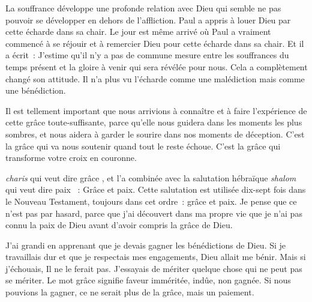 
La souffrance développe une profonde relation avec Dieu qui semble
 ne pas pouvoir se développer en dehors de l'affliction.
 Paul a appris à louer Dieu par cette écharde dans sa chair.
 Le jour est même arrivé où Paul a vraiment commencé à se réjouir
 et à remercier Dieu pour cette écharde dans sa chair.
 Et il a écrit~: 
 \og J'estime qu'il n'y a pas de commune mesure entre les souffrances
 du temps présent et la gloire à venir qui sera révélée pour nous. \fg{}
 Cela a complètement changé son attitude. Il n'a plus vu l'écharde
 comme une malédiction mais comme une bénédiction.

Il est tellement important que nous arrivions à connaître
 et à faire l'expérience de cette grâce toute-suffisante,
 parce qu'elle nous guidera dans les moments les plus sombres,
 et nous aidera à garder le sourire dans nos moments de déception.
 C'est la grâce qui va nous soutenir quand tout le reste échoue.
 C'est la grâce qui transforme votre croix en couronne.

\dvrule






 \emph{charis}
 qui veut dire \og grâce \fg{}, et l'a combinée avec la salutation
 hébraïque \emph{shalom} qui veut dire \og paix \fg{}~: 
 \og Grâce et paix. \fg{}
 Cette salutation est utilisée dix-sept fois dans le Nouveau Testament,
 toujours dans cet ordre~:  \og grâce et paix. \fg{}
 Je pense que ce n'est pas par hasard, parce que j'ai découvert
 dans ma propre vie que je n'ai pas connu la paix de Dieu
 avant d'avoir compris la grâce de Dieu.

J'ai grandi en apprenant que je devais gagner les bénédictions de Dieu.
 Si je travaillais dur et que je respectais mes engagements,
 Dieu allait me bénir. Mais si j'échouais, Il ne le ferait pas.
 J'essayais de mériter quelque chose qui ne peut pas se mériter.
 Le mot \og grâce \fg{} signifie \og faveur imméritée, indûe,
 non gagnée. \fg{} Si nous pouvions la gagner,
 ce ne serait plus de la grâce, mais un paiement.

